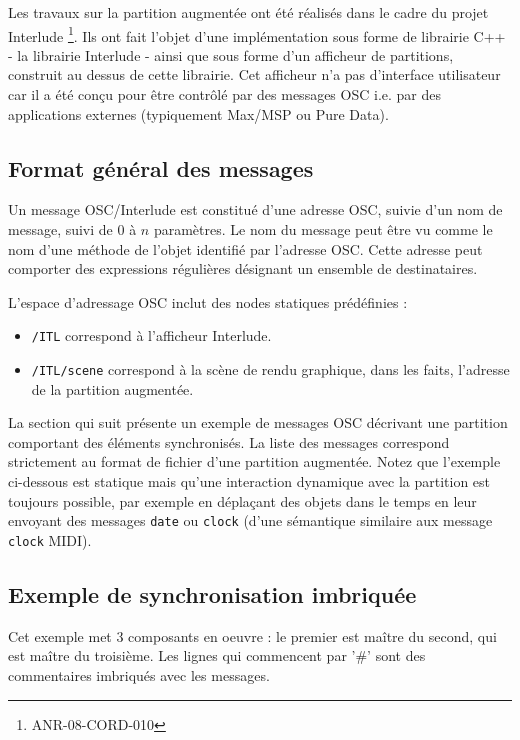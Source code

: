 \documentclass{article}
\newcommand{\osc}[1]			{{\small \texttt{#1}}}
\begin{document}
Les travaux sur la partition augmentée ont été réalisés dans le cadre du projet Interlude \footnote{ANR-08-CORD-010}. Ils ont fait l'objet d'une implémentation sous forme de librairie C++ - la librairie Interlude - ainsi que sous forme d'un afficheur de partitions, construit au dessus de cette librairie. Cet afficheur n'a pas d'interface utilisateur car il a été conçu pour être contrôlé par des messages OSC i.e. par des applications externes (typiquement Max/MSP ou Pure Data).


\subsection{Format général des messages}

Un message OSC/Interlude est constitué d'une adresse OSC, suivie d'un nom de message, suivi de $0$ à $n$ paramètres. 
Le nom du message peut être vu comme le nom d'une méthode de l'objet identifié par l'adresse OSC. Cette adresse peut  comporter des expressions régulières désignant un ensemble de destinataires.

L'espace d'adressage OSC inclut des nodes statiques prédéfinies :
\begin{itemize}
\item \osc{/ITL} correspond à l'afficheur Interlude.
\item \osc{/ITL/scene} correspond à la scène de rendu graphique, dans les faits, 
		l'adresse de la partition augmentée.
\end{itemize}

La section qui suit présente un exemple de messages OSC décrivant une partition comportant des éléments synchronisés. La liste des messages correspond strictement au format de fichier d'une partition augmentée.
Notez que l'exemple ci-dessous est statique mais qu'une interaction dynamique avec la partition est toujours possible, par exemple en déplaçant des objets dans le temps en leur envoyant des messages \osc{date} ou \osc{clock} (d'une sémantique similaire aux message \osc{clock} MIDI).



\subsection{Exemple de synchronisation imbriquée}

Cet exemple met 3 composants en oeuvre : le premier est maître du second, qui est maître du troisième. Les lignes qui commencent par '\#' sont des commentaires imbriqués avec les messages.
\end{document}
